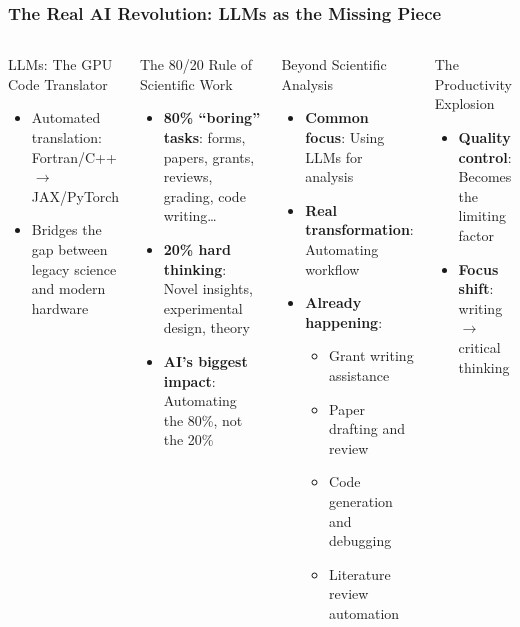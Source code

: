 \documentclass[aspectratio=169]{beamer}
\begin{document}
\begin{frame}
    \frametitle{The Real AI Revolution: LLMs as the Missing Piece}
    \begin{columns}
        \begin{block}{LLMs: The GPU Code Translator}
            \begin{itemize}
                \item Automated translation: Fortran/C++ $\rightarrow$ JAX/PyTorch
                \item Bridges the gap between legacy science and modern hardware
            \end{itemize}
        \end{block}
        \begin{block}{The 80/20 Rule of Scientific Work}
            \begin{itemize}
                \item \textbf{80\% ``boring'' tasks}: forms, papers, grants, reviews, grading, code writing\ldots
                \item \textbf{20\% hard thinking}: Novel insights, experimental design, theory
                \item \textbf{AI's biggest impact}: Automating the 80\%, not the 20\%
            \end{itemize}
        \end{block}
        \begin{block}{Beyond Scientific Analysis}
            \begin{itemize}
                \item \textbf{Common focus}: Using LLMs for analysis
                \item \textbf{Real transformation}: Automating workflow
                \item \textbf{Already happening}:
                    \begin{itemize}
                        \item Grant writing assistance
                        \item Paper drafting and review
                        \item Code generation and debugging
                        \item Literature review automation
                    \end{itemize}
            \end{itemize}
        \end{block}
        \begin{block}{The Productivity Explosion}
            \begin{itemize}
                \item \textbf{Quality control}: Becomes the limiting factor
                \item \textbf{Focus shift}: writing $\rightarrow$ critical thinking
            \end{itemize}
        \end{block}
    \end{columns}
\end{frame}
\end{document}

